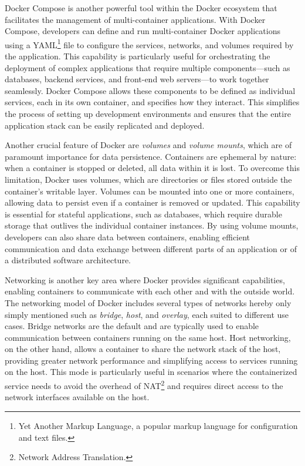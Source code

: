 Docker Compose \cite{docker_inc_docker_nodate-3} is another powerful tool within the Docker ecosystem that facilitates the management of multi-container applications. With Docker Compose, developers can define and run multi-container Docker applications using a YAML\footnote{Yet Another Markup Language, a popular markup language for configuration and text files.} file to configure the services, networks, and volumes required by the application. This capability is particularly useful for orchestrating the deployment of complex applications that require multiple components—such as databases, backend services, and front-end web servers—to work together seamlessly. Docker Compose allows these components to be defined as individual services, each in its own container, and specifies how they interact. This simplifies the process of setting up development environments and ensures that the entire application stack can be easily replicated and deployed.

Another crucial feature of Docker are \emph{volumes} and \emph{volume mounts}, which are of paramount importance for data persistence. Containers are ephemeral by nature: when a container is stopped or deleted, all data within it is lost. To overcome this limitation, Docker uses volumes, which are directories or files stored outside the container's writable layer. Volumes can be mounted into one or more containers, allowing data to persist even if a container is removed or updated. This capability is essential for stateful applications, such as databases, which require durable storage that outlives the individual container instances. By using volume mounts, developers can also share data between containers, enabling efficient communication and data exchange between different parts of an application or of a distributed software architecture.

Networking is another key area where Docker provides significant capabilities, enabling containers to communicate with each other and with the outside world. The networking model of Docker includes several types of networks hereby only simply mentioned such as \emph{bridge}, \emph{host}, and \emph{overlay}, each suited to different use cases. Bridge networks are the default and are typically used to enable communication between containers running on the same host. Host networking, on the other hand, allows a container to share the network stack of the host, providing greater network performance and simplifying access to services running on the host. This mode is particularly useful in scenarios where the containerized service needs to avoid the overhead of NAT\footnote{Network Address Translation.} and requires direct access to the network interfaces available on the host.

